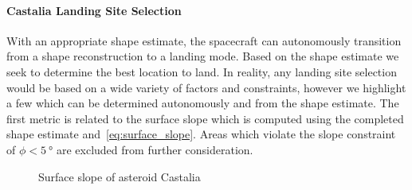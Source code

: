 \documentclass[journal]{new-aiaa}
\begin{document}
\paragraph{Castalia Landing Site Selection}

With an appropriate shape estimate, the spacecraft can autonomously transition from a shape reconstruction to a landing mode.
Based on the shape estimate we seek to determine the best location to land. 
In reality, any landing site selection would be based on a wide variety of factors and constraints, however we highlight a few which can be determined autonomously and from the shape estimate.
The first metric is related to the surface slope which is computed using the completed shape estimate and~\cref{eq:surface_slope}.
Areas which violate the slope constraint of \( \phi < \SI{5}{\degree} \) are excluded from further consideration.
\begin{figure}[htbp]
    \centering
    \caption{Surface slope of asteroid Castalia\label{fig:surface_slope_castalia_both}}
\end{figure}
\end{document}
